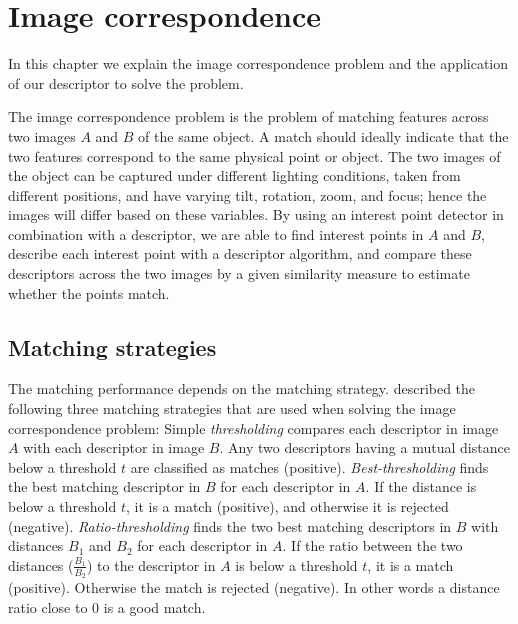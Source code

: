 \documentclass[thesis.tex]{subfiles}
\begin{document}
\chapter{Image correspondence}
\label{sec:ic}

In this chapter we explain the image correspondence problem and the application of our descriptor to solve the problem.

The image correspondence problem is the problem of matching features across two images $A$ and $B$ of the same object. A match should ideally indicate that the two features correspond to the same physical point or object. The two images of the object can be captured under different lighting conditions, taken from different positions, and have varying tilt, rotation, zoom, and focus; hence the images will differ based on these variables. By using an interest point detector in combination with a descriptor, we are able to find interest points in $A$ and $B$, describe each interest point with a descriptor algorithm, and compare these descriptors across the two images by a given similarity measure to estimate whether the points match.

\section{Matching strategies}
\label{sec:matching_strategies}

The matching performance depends on the matching strategy. \citet{mikolajczyk2005performance} described the following three matching strategies that are used when solving the image correspondence problem:
Simple \emph{thresholding} compares each descriptor in image $A$ with each descriptor in image $B$. Any two descriptors having a mutual distance below a threshold $t$ are classified as matches (positive). \emph{Best-thresholding} finds the best matching descriptor in $B$ for each descriptor in $A$. If the distance is below a threshold $t$, it is a match (positive), and otherwise it is rejected (negative). \emph{Ratio-thresholding} finds the two best matching descriptors in $B$ with distances $B_1$ and $B_2$ for each descriptor in $A$. If the ratio between the two distances ($\frac{B_1}{B_2}$) to the descriptor in $A$ is below a threshold $t$, it is a match (positive). Otherwise the match is rejected (negative). In other words a distance ratio close to 0 is a good match.
\end{document}
